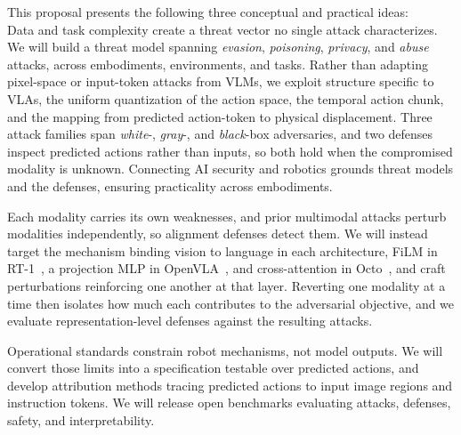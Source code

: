 {This proposal presents the following three conceptual and practical ideas: 
\\
 Data and task complexity create a threat
vector no single attack characterizes. We will build a threat model spanning \textit{evasion},
\textit{poisoning}, \textit{privacy}, and \textit{abuse} attacks, across embodiments, environments, and tasks. Rather
than adapting pixel-space or input-token attacks from VLMs, we exploit structure specific to VLAs, the uniform
quantization of the action space, the temporal action chunk, and the mapping from predicted action-token to
physical displacement. Three attack families span \emph{white}-, \emph{gray}-, and \emph{black}-box adversaries, and two
defenses inspect predicted actions rather than inputs, so both hold when the compromised modality is
unknown. Connecting AI security and robotics grounds threat models and the defenses, ensuring practicality across embodiments.

 Each modality carries
its own weaknesses, and prior multimodal attacks perturb modalities independently, so alignment
defenses detect them. We will instead target the mechanism binding vision to language in each
architecture, \eg FiLM in RT-1~\cite{rt-1}, a projection MLP in OpenVLA~\cite{kim2024openvla}, and
cross-attention in Octo~\cite{team2024octo}, and craft perturbations reinforcing one another at that
layer. Reverting one modality at a time then isolates how much each contributes to the adversarial
objective, and we evaluate representation-level defenses against the resulting attacks.

 Operational standards constrain robot mechanisms, not model outputs. We will convert those limits into a specification testable over predicted actions, and develop attribution methods
tracing predicted actions to input image regions and instruction tokens. We will release open benchmarks evaluating attacks, defenses, safety, and interpretability.












}

